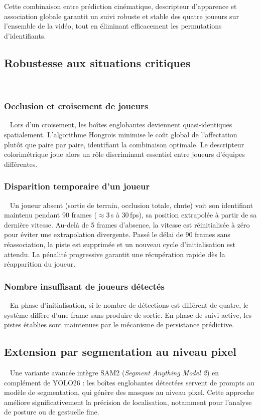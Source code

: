 Cette combinaison entre prédiction cinématique, descripteur d’apparence et association globale garantit un suivi robuste et stable des quatre joueurs sur l’ensemble de la vidéo, tout en éliminant efficacement les permutations d’identifiants.

\subsection{Robustesse aux situations critiques}
 
\subsubsection{Occlusion et croisement de joueurs}
 
Lors d'un croisement, les boîtes englobantes deviennent
quasi-identiques spatialement.
L'algorithme Hongrois minimise le coût global de l'affectation plutôt
que paire par paire, identifiant la combinaison optimale.
Le descripteur colorimétrique joue alors un rôle discriminant essentiel
entre joueurs d'équipes différentes.
 
\subsubsection{Disparition temporaire d'un joueur}
 
Un joueur absent (sortie de terrain, occlusion totale, chute) voit son
identifiant maintenu pendant 90 frames ($\approx$3\,s à 30\,fps), sa
position extrapolée à partir de sa dernière vitesse.
Au-delà de 5 frames d'absence, la vitesse est réinitialisée à zéro
pour éviter une extrapolation divergente.
Passé le délai de 90 frames sans réassociation, la piste est supprimée
et un nouveau cycle d'initialisation est attendu.
La pénalité progressive garantit une récupération rapide dès la
réapparition du joueur.
 
\subsubsection{Nombre insuffisant de joueurs détectés}
 
En phase d'initialisation, si le nombre de détections est différent de
quatre, le système diffère d'une frame sans produire de sortie.
En phase de suivi active, les pistes établies sont maintenues par le
mécanisme de persistance prédictive.
 
\subsection{Extension par segmentation au niveau pixel}
 
Une variante avancée intègre SAM2 (\textit{Segment Anything Model 2}) en
complément de YOLO26 : les boîtes englobantes détectées servent de
prompts au modèle de segmentation, qui génère des masques au niveau pixel.
Cette approche améliore significativement la précision de localisation,
notamment pour l'analyse de posture ou de gestuelle fine.

